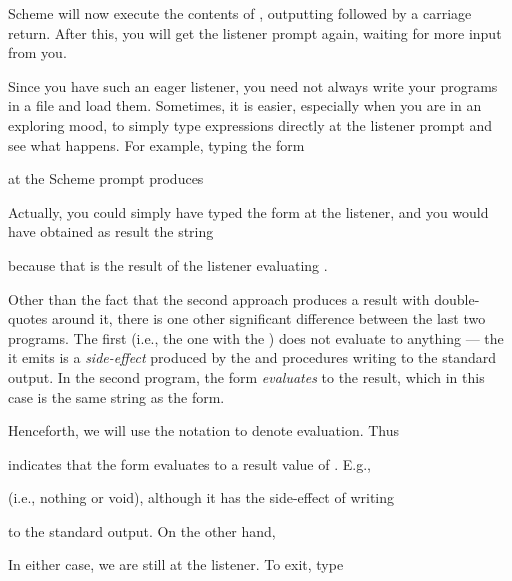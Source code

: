 
\n Scheme will now execute the contents of
, outputting  followed
by a carriage return.  After this, you will get the listener
prompt again, waiting for more input from you.

Since you have such an eager listener, you need not
always write your programs in a file and load them.
Sometimes, it is easier, especially when you are in an
exploring mood, to simply type expressions directly at
the listener prompt and see what happens.  For example,
typing the form


\n at the Scheme prompt produces


Actually, you could simply have typed the form
 at the listener, and you would have
obtained as result the string


\n because that is the result of the listener evaluating
.

Other than the fact that the second approach produces a
result with double-quotes around it, there is one other
significant difference between the last two programs.
The first (i.e., the one with the ) does not evaluate
to anything — the  it emits is a
{\em side-effect} produced by the  and
 procedures writing to the standard output.
In the second program, the form
 {\em evaluates} to the result, which
in this case is the same string as the form.

Henceforth, we will use the notation  to denote
evaluation.  Thus


\n indicates that the form  evaluates to a result value
of .  E.g.,


\n (i.e., nothing or void), although it has the side-effect of writing


\n to the standard output.
On the other hand,


\n In either case, we are still at the listener.  To exit,
type

